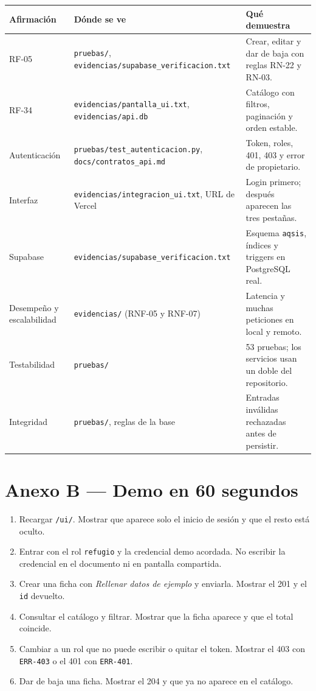 \documentclass[11pt,a4paper]{article}
\newcommand{\code}[1]{\texttt{#1}}
\begin{document}
\begin{tabularx}{\linewidth}{@{}p{3.1cm}p{3.2cm}X@{}}
\toprule
\textbf{Afirmación} & \textbf{Dónde se ve} & \textbf{Qué demuestra} \\
\midrule
RF-05 & \code{pruebas/}, \code{evidencias/supabase\_verificacion.txt} &
  Crear, editar y dar de baja con reglas RN-22 y RN-03. \\
RF-34 & \code{evidencias/pantalla\_ui.txt}, \code{evidencias/api.db} &
  Catálogo con filtros, paginación y orden estable. \\
Autenticación & \code{pruebas/test\_autenticacion.py},
  \code{docs/contratos\_api.md} &
  Token, roles, 401, 403 y error de propietario. \\
Interfaz & \code{evidencias/integracion\_ui.txt}, URL de Vercel &
  Login primero; después aparecen las tres pestañas. \\
Supabase & \code{evidencias/supabase\_verificacion.txt} &
  Esquema \code{aqsis}, índices y triggers en PostgreSQL real. \\
Desempeño y escalabilidad & \code{evidencias/} (RNF-05 y RNF-07) &
  Latencia y muchas peticiones en local y remoto. \\
Testabilidad & \code{pruebas/} &
  53 pruebas; los servicios usan un doble del repositorio. \\
Integridad & \code{pruebas/}, reglas de la base &
  Entradas inválidas rechazadas antes de persistir. \\
\bottomrule
\end{tabularx}

\section{Anexo B --- Demo en 60 segundos}

\begin{enumerate}[leftmargin=*]
  \item Recargar \code{/ui/}. Mostrar que aparece solo el inicio de sesión y
    que el resto está oculto.
  \item Entrar con el rol \code{refugio} y la credencial demo acordada. No
    escribir la credencial en el documento ni en pantalla compartida.
  \item Crear una ficha con \emph{Rellenar datos de ejemplo} y enviarla. Mostrar
    el 201 y el \code{id} devuelto.
  \item Consultar el catálogo y filtrar. Mostrar que la ficha aparece y que el
    total coincide.
  \item Cambiar a un rol que no puede escribir o quitar el token. Mostrar el
    403 con \code{ERR-403} o el 401 con \code{ERR-401}.
  \item Dar de baja una ficha. Mostrar el 204 y que ya no aparece en el
    catálogo.
\end{enumerate}
\end{document}
